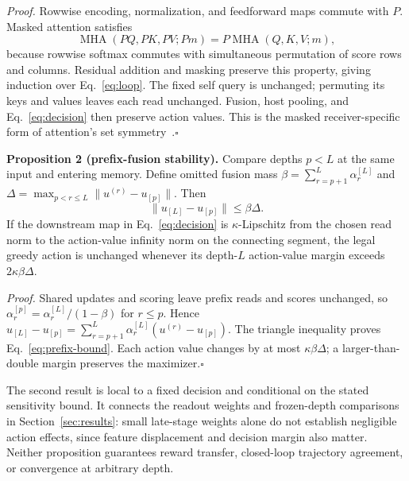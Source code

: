 \emph{Proof.} Rowwise encoding, normalization, and feedforward maps commute with $P$. Masked attention satisfies
\begin{equation}
 \operatorname{MHA}(PQ,PK,PV;Pm)
 =P\operatorname{MHA}(Q,K,V;m),
 \label{eq:permutation}
\end{equation}
because rowwise softmax commutes with simultaneous permutation of score rows and columns. Residual addition and masking preserve this property, giving induction over Eq.~\eqref{eq:loop}. The fixed self query is unchanged; permuting its keys and values leaves each read unchanged. Fusion, host pooling, and Eq.~\eqref{eq:decision} then preserve action values. This is the masked receiver-specific form of attention's set symmetry~\cite{lee2019settransformer}.\hfill$\square$

\noindent\textbf{Proposition 2 (prefix-fusion stability).}
Compare depths $p<L$ at the same input and entering memory. Define omitted fusion mass $\beta=\sum_{r=p+1}^{L}\alpha_r^{[L]}$ and $\Delta=\max_{p<r\leq L}\|u^{(r)}-u_{[p]}\|$. Then
\begin{equation}
 \|u_{[L]}-u_{[p]}\|\leq\beta\Delta.
 \label{eq:prefix-bound}
\end{equation}
If the downstream map in Eq.~\eqref{eq:decision} is $\kappa$-Lipschitz from the chosen read norm to the action-value infinity norm on the connecting segment, the legal greedy action is unchanged whenever its depth-$L$ action-value margin exceeds $2\kappa\beta\Delta$.

\emph{Proof.} Shared updates and scoring leave prefix reads and scores unchanged, so $\alpha_r^{[p]}=\alpha_r^{[L]}/(1-\beta)$ for $r\leq p$. Hence
$u_{[L]}-u_{[p]}=\sum_{r=p+1}^{L}\alpha_r^{[L]}(u^{(r)}-u_{[p]})$.
The triangle inequality proves Eq.~\eqref{eq:prefix-bound}. Each action value changes by at most $\kappa\beta\Delta$; a larger-than-double margin preserves the maximizer.\hfill$\square$

The second result is local to a fixed decision and conditional on the stated sensitivity bound. It connects the readout weights and frozen-depth comparisons in Section~\ref{sec:results}: small late-stage weights alone do not establish negligible action effects, since feature displacement and decision margin also matter. Neither proposition guarantees reward transfer, closed-loop trajectory agreement, or convergence at arbitrary depth.
